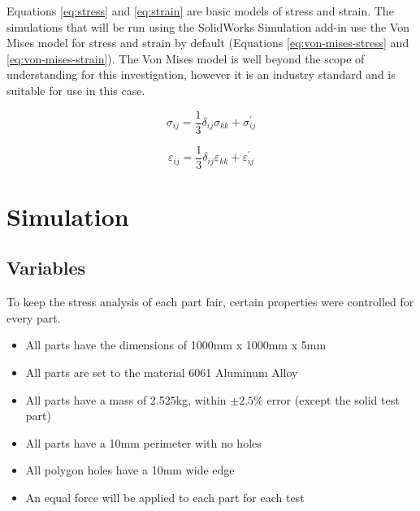 \documentclass[12pt, letterpaper]{article}
\begin{document}
Equations \ref{eq:stress} and \ref{eq:strain} are basic models of stress and strain. The simulations that will be run using the SolidWorks Simulation add-in use the Von Mises model for stress and strain by default (Equations \ref{eq:von-mises-stress} and \ref{eq:von-mises-strain}). The Von Mises model is well beyond the scope of understanding for this investigation, however it is an industry standard and is suitable for use in this case. 

\begin{equation}
	\label{eq:von-mises-stress}
	\sigma_{ij} = \frac{1}{3} \delta_{ij} \sigma_{kk} + \sigma^\prime_{ij}
\end{equation}

\begin{equation}
	\label{eq:von-mises-strain}
	\varepsilon_{ij} = \frac{1}{3} \delta_{ij} \varepsilon_{kk} + \varepsilon^\prime_{ij}
\end{equation}

\section{Simulation}
\label{sec:simulation}

\subsection{Variables}
\label{sec:variables}

To keep the stress analysis of each part fair, certain properties were controlled for every part. 

\begin{itemize}
\item All parts have the dimensions of 1000mm x 1000mm x 5mm
\item All parts are set to the material 6061 Aluminum Alloy
\item All parts have a mass of 2.525kg, within $\pm2.5\%$ error (except the solid test part)
\item All parts have a 10mm perimeter with no holes
\item All polygon holes have a 10mm wide edge
\item An equal force will be applied to each part for each test
\end{itemize}
\end{document}
